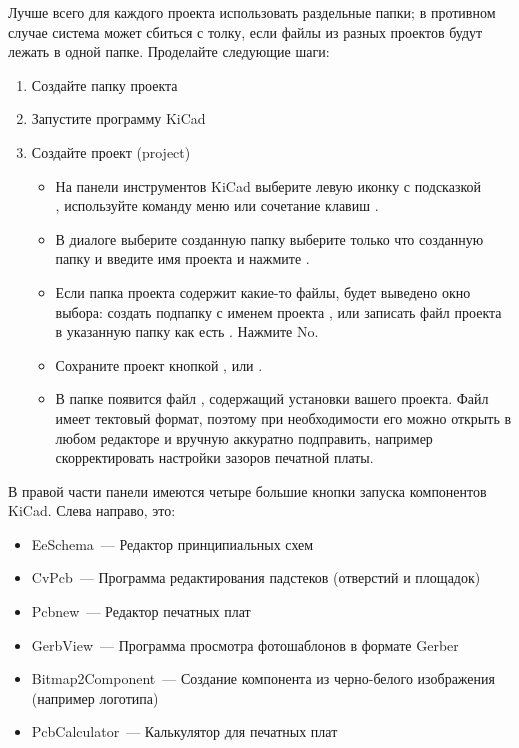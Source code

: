 
Лучше всего для каждого проекта использовать раздельные папки; в противном
случае система может сбиться с толку, если файлы из разных проектов будут лежать
в одной папке. Проделайте следующие шаги:

\begin{enumerate}
  \item Создайте папку проекта 
  \item Запустите программу KiCad
  \item Создайте проект (project)
  \begin{itemize}
    \item 
На панели инструментов KiCad выберите левую иконку с подсказкой\\
, используйте команду меню
 или сочетание клавиш .
    \item 
В диалоге  выберите созданную папку
выберите только что созданную папку  и
введите имя проекта  и нажмите .
	\item
Если папка проекта содержит какие-то файлы, будет выведено окно выбора:
создать подпапку с именем проекта , или записать файл проекта
в указанную папку как есть . Нажмите No.
    \item 
Сохраните проект кнопкой , 
или .
	\item
В папке появится файл , содержащий установки вашего 
проекта. Файл имеет тектовый формат, поэтому при необходимости его можно открыть
в любом редакторе и вручную аккуратно подправить, например скорректировать
настройки зазоров печатной платы.
  \end{itemize}
\end{enumerate}

В правой части панели имеются четыре большие кнопки запуска компонентов KiCad.
Слева направо, это:

\begin{itemize}
\item EeSchema\ --- Редактор принципиальных схем
\item CvPcb\ --- Программа редактирования падстеков (отверстий и площадок)
\item Pcbnew\ --- Редактор печатных плат
\item GerbView\ --- Программа просмотра фотошаблонов в формате Gerber
\item Bitmap2Component\ --- Создание компонента из черно-белого изображения
(например логотипа)
\item PcbCalculator\ --- Калькулятор для печатных плат
\end{itemize}

